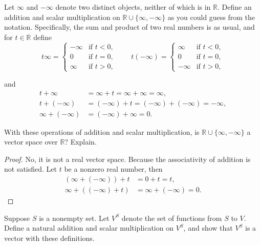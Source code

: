\begin{exercise}
    Let $\infty$ and $-\infty$ denote two distinct objects, neither of which is in $\mathbb{R}$. Define an addition and scalar multiplication on $\mathbb{R}\cup \{ \infty, -\infty \}$ as you could guess from the notation. Specifically, the sum and product of two real numbers is as usual, and for $t\in\mathbb{R}$ define
    \[
        t\infty = \begin{cases}
            -\infty & \text{if $t < 0$}, \\
            0       & \text{if $t = 0$}, \\
            \infty  & \text{if $t > 0$},
        \end{cases}
        \qquad
        t(-\infty) = \begin{cases}
            \infty  & \text{if $t < 0$}, \\
            0       & \text{if $t = 0$}, \\
            -\infty & \text{if $t > 0$},
        \end{cases}
    \]

    and
    \begin{align*}
        t + \infty         & = \infty + t = \infty + \infty = \infty,           \\
        t + (-\infty)      & = (-\infty) + t = (-\infty) + (-\infty) = -\infty, \\
        \infty + (-\infty) & = (-\infty) + \infty = 0.
    \end{align*}

    With these operations of addition and scalar multiplication, is $\mathbb{R}\cup \{ \infty, -\infty \}$ a vector space over $\mathbb{R}$? Explain.
\end{exercise}

\begin{proof}
    No, it is not a real vector space. Because the associativity of addition is not satisfied. Let $t$ be a nonzero real number, then
    \begin{align*}
        (\infty + (-\infty)) + t & = 0 + t = t,              \\
        \infty + ((-\infty) + t) & = \infty + (-\infty) = 0.
    \end{align*}
\end{proof}

\begin{exercise}
    Suppose $S$ is a nonempty set. Let $V^{S}$ denote the set of functions from $S$ to $V$. Define a natural addition and scalar multiplication on $V^{S}$, and show that $V^{S}$ is a vector with these definitions.
\end{exercise}

